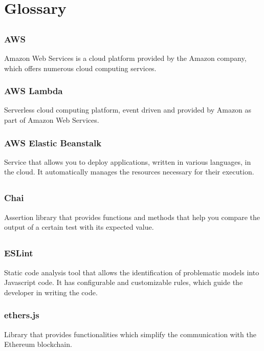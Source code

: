 \section{Glossary}
	\subsection*{}
		\subsubsection*{AWS}
			Amazon Web Services is a cloud platform provided by the Amazon company, which offers numerous cloud computing services.
		\subsubsection*{AWS Lambda}
			Serverless cloud computing platform, event driven and provided by Amazon as part of Amazon Web Services.
			
		\subsubsection*{AWS Elastic Beanstalk}
			Service that allows you to deploy applications, written in various languages, in the cloud. It automatically manages the resources necessary for their execution.
			
	\subsection*{}
		\subsubsection*{Chai}
			Assertion library that provides functions and methods that help you compare the output of a certain test with its expected value.
			
	\subsection*{}
		\subsubsection*{ESLint}
			Static code analysis tool that allows the identification of problematic models into Javascript code. It has configurable and customizable rules, which guide the developer in writing the code.
		\subsubsection*{ethers.js}
			Library that provides functionalities which simplify the communication with the Ethereum blockchain.
	
